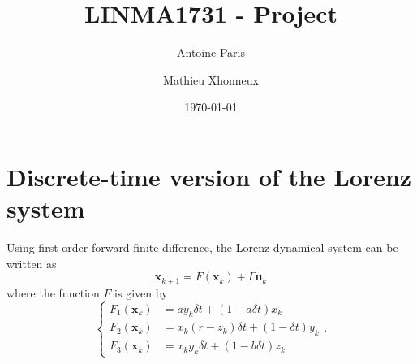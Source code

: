\documentclass[english, DIV=13]{scrartcl}
\title{LINMA1731 - Project}
\author{Antoine Paris\and Mathieu Xhonneux}
\date{\today}
\renewcommand{\vec}[1]{\mathbf{#1}}
\begin{document}
\maketitle

\section{Discrete-time version of the Lorenz system}
Using first-order forward finite difference, the Lorenz dynamical system can be written as
\[ \vec{x}_{k+1} = F(\vec{x}_k) + \Gamma\vec{u}_k \]
where the function $F$ is given by
\begin{equation}
    \begin{cases}
        F_1(\vec{x}_k) &= ay_k\delta t + (1-a\delta t)x_k \\
        F_2(\vec{x}_k) &= x_k(r-z_k)\delta t + (1-\delta t)y_k \\
        F_3(\vec{x}_k) &= x_ky_k\delta t + (1-b\delta t)z_k
    \end{cases}.
    \label{eq:F}
\end{equation}
\end{document}
